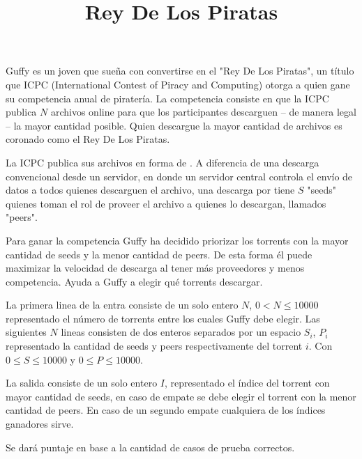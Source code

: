 \documentclass{oci}
\title{Rey De Los Piratas}
\begin{document}
\begin{problemDescription}
    Guffy es un joven que sueña con convertirse en el "Rey De Los Piratas", un título que ICPC (International
    Contest of Piracy and Computing) otorga a quien gane su competencia anual de piratería. La competencia 
    consiste en que la ICPC publica $N$ archivos online para que los participantes descarguen -- de
    manera legal -- la mayor cantidad posible. Quien descargue la mayor cantidad de archivos es coronado como
    el Rey De Los Piratas.

    La ICPC publica sus archivos en forma de . A diferencia de una descarga convencional desde
    un servidor, en donde un servidor central controla el envío de datos a todos quienes descarguen el 
    archivo, una descarga por  tiene $S$ "seeds" quienes toman el rol de proveer el archivo
    a quienes lo descargan, llamados "peers".

    Para ganar la competencia Guffy ha decidido priorizar los torrents con la mayor cantidad de seeds y la menor
    cantidad de peers. De esta forma él puede maximizar la velocidad de descarga al tener más proveedores y menos
    competencia. Ayuda a Guffy a elegir qué torrents descargar.
\end{problemDescription}

\begin{inputDescription}
La primera linea de la entra consiste de un solo entero $N$, $0 < N \leq 10000$ representado el número de torrents
entre los cuales Guffy debe elegir. Las siguientes $N$ lineas consisten de dos enteros separados por un espacio
$S_i$, $P_i$ representado la cantidad de seeds y peers respectivamente del torrent $i$. Con $0 \leq S \leq 10000$ 
y $0 \leq P \leq 10000$.
\end{inputDescription}

\begin{outputDescription}
    La salida consiste de un solo entero $I$, representado el índice del torrent con mayor cantidad de seeds, en
    caso de empate se debe elegir el torrent con la menor cantidad de peers. 
    En caso de un segundo empate cualquiera de los índices ganadores sirve.
\end{outputDescription}

\begin{scoreDescription}
    Se dará puntaje en base a la cantidad de casos de prueba correctos.
\end{scoreDescription}

\begin{sampleDescription}
\end{sampleDescription}
\end{document}
